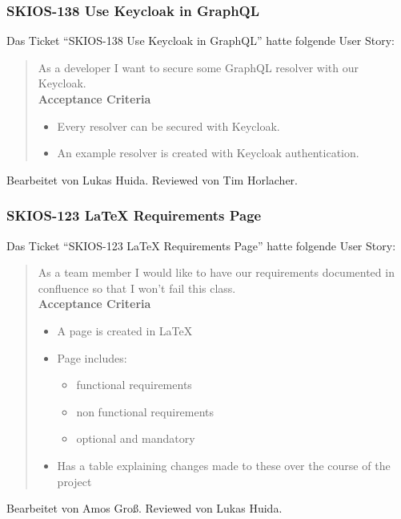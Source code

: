 \subsubsection{SKIOS-138 Use Keycloak in GraphQL}
Das Ticket \enquote{SKIOS-138 Use Keycloak in GraphQL} hatte folgende User Story:
\begin{quotation}
    As a developer I want to secure some GraphQL resolver with our Keycloak. \\
    \textbf{Acceptance Criteria}
    \begin{itemize}
        \item Every resolver can be secured with Keycloak.
        \item An example resolver is created with Keycloak authentication.
    \end{itemize}
\end{quotation}
Bearbeitet von Lukas Huida.
Reviewed von Tim Horlacher.

\subsubsection{SKIOS-123 LaTeX Requirements Page}
Das Ticket \enquote{SKIOS-123 LaTeX Requirements Page} hatte folgende User Story:
\begin{quotation}
    As a team member I would like to have our requirements documented in confluence so that I won't fail this class. \\
\textbf{Acceptance Criteria}
\begin{itemize}
    \item A page is created in LaTeX
    \item Page includes:
    \begin{itemize}
        \item functional requirements
        \item non functional requirements 
        \item optional and mandatory
    \end{itemize}
    \item Has a table explaining changes made to these over the course of the project
\end{itemize}
\end{quotation}
Bearbeitet von Amos Groß.
Reviewed von Lukas Huida.


